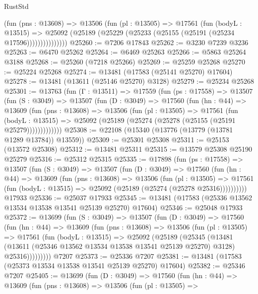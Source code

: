 \begin{lexlean}{RustStd}
\begin{coremodule}
                (fun (pns : @13608) =>
                @13506
                  (fun (pl : @13505) =>
                  @17561
                    (fun (bodyL : @13515) =>
                    @25092 (@25189 (@25229 (@25233 (@25155 (@25191 (@25234 @17596)))))))))))))))
@25260 := @7206 @17843
@25262 := @3230 @7239 @3236
@25263 := @6470 @25262
@25264 := @6469 @25263
@25266 := @5863 @25264 @3188
@25268 := @25260 (@7218 @25266)
@25269 := @25259 @25268
@25270 := @25224 @25268
@25274 := @13481 (@17583 (@25141 @25270) @17604)
@25278 := @13481 (@13611 (@25146 @25270) @3128)
@25279 := @25234 @25268
@25301 := @13763
    (fun (Γ : @13511) =>
    @17559
      (fun (ps : @17558) =>
      @13507
        (fun (S : @3049) =>
        @13507
          (fun (D : @3049) =>
          @17560
            (fun (hn : @44) =>
            @13609
              (fun (pns : @13608) =>
              @13506
                (fun (pl : @13505) =>
                @17561
                  (fun (bodyL : @13515) =>
                  @25092 (@25189 (@25274 (@25278 (@25155 (@25191 @25279)))))))))))))
@25308 := @22108 (@15340 (@13776 (@13779 (@13781 @1289 @13784)) @13559))
@25309 := @25301 @25308
@25311 := @25153 (@13572 @25308)
@25312 := @13481 @25311
@25315 := @13579 @25308 @25190 @25279
@25316 := @25312 @25315
@25335 := @17898
    (fun (ps : @17558) =>
    @13507
      (fun (S : @3049) =>
      @13507
        (fun (D : @3049) =>
        @17560
          (fun (hn : @44) =>
          @13609
            (fun (pns : @13608) =>
            @13506
              (fun (pl : @13505) =>
              @17561 (fun (bodyL : @13515) => @25092 (@25189 (@25274 (@25278 @25316))))))))))
    @17933
@25336 := @25037 @17933
@25345 := @13481 (@17583 (@25336 @13562 @13534 @13538 @13541 @25139 @25270) @17604)
@25346 := @25048 @17933
@25372 := @13699
    (fun (S : @3049) =>
    @13507
      (fun (D : @3049) =>
      @17560
        (fun (hn : @44) =>
        @13609
          (fun (pns : @13608) =>
          @13506
            (fun (pl : @13505) =>
            @17561
              (fun (bodyL : @13515) =>
              @25092
                (@25189
                  (@25345
                    (@13481
                      (@13611 (@25346 @13562 @13534 @13538 @13541 @25139 @25270) @3128)
                      @25316)))))))))
    @7207
@25373 := @25336 @7207
@25381 := @13481 (@17583 (@25373 @13534 @13538 @13541 @25139 @25270) @17604)
@25382 := @25346 @7207
@25405 := @13699
    (fun (D : @3049) =>
    @17560
      (fun (hn : @44) =>
      @13609
        (fun (pns : @13608) =>
        @13506
          (fun (pl : @13505) =>

\end{coremodule}
\end{lexlean}
